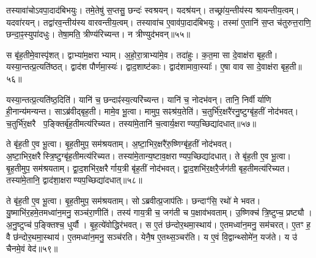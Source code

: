 तस्यावा॑चो\-ऽवपा॒दाद॑बिभयुः।
तमे॒तेषु॑ स॒प्तसु॒ छन्दः॑ स्वश्रयन्।
यदश्र॑यन्।
तच्छ्रा॑य॒न्तीय॑स्य श्रायन्तीय॒त्वम्।
यदवा॑रयन्।
तद्वा॑र\-व॒न्तीय॑स्य वारवन्तीय॒त्वम्।
तस्यावा॑च ए॒वाव॑पा॒दाद॑बिभयुः।
तस्मा॑ ए॒तानि॑ स॒प्त च॑तुरुत्त॒राणि॒ छन्दा॒ꣴ॒स्युपा॑दधुः।
तेषा॒मति॒ त्रीण्य॑रिच्यन्त।
न त्रीण्युद॑\-भवन्॥५५॥

स बृ॑ह॒तीमे॒वास्पृ॑शत्।
द्वाभ्या॑म॒क्षराभ्याम्।
अ॒हो॒रा॒त्राभ्या॑मे॒व।
तदा॑हुः।
क॒त॒मा सा दे॒वाक्ष॑रा बृह॒ती।
यस्या॒न्तत्प्र॒त्यति॑ष्ठत्।
द्वाद॑श पौर्णमा॒स्यः॑।
द्वाद॒शाष्ट॑काः।
द्वाद॑शामावा॒स्याः᳚।
ए॒षा वाव सा दे॒वाक्ष॑रा बृह॒ती॥५६॥

यस्या॒न्तत्प्र॒त्यति॑ष्ठ॒दिति॑।
यानि॑ च॒ छन्दाꣴ॑स्य॒त्यरि॑च्यन्त।
यानि॑ च॒ नोदभ॑वन्।
तानि॒ निर्वीर्याणि ही॒नान्य॑मन्यन्त।
साऽब्र॑वीद्बृह॒ती।
मामे॒व भू॒त्वा।
मामुप॒ सꣴश्र॑य॒तेति॑।
च॒तुर्भि॑र॒क्षरै॑रनु॒ष्टुग्बृ॑ह॒तीं नोद॑भवत्।
च॒तुर्भि॑र॒क्षरै प॒ङ्क्तिर्बृ॑ह॒ती\-मत्य॑रिच्यत।
तस्या॑मे॒तानि॑ च॒त्वार्य॒क्षराण्यप॒च्छिद्या॑\-दधात्॥५७॥

ते बृ॑ह॒ती ए॒व भू॒त्वा।
बृ॒ह॒तीमुप॒ सम॑श्रयताम्।
अ॒ष्टा॒भि\-र॒क्षरै॑रु॒ष्णिग्बृ॑ह॒तीं नोद॑भवत्।
अ॒ष्टा॒भि\-र॒क्षरैस्त्रि॒ष्टुग्बृ॑ह॒ती\-मत्य॑\-रिच्यत।
तस्या॑मे॒तान्य॒ष्टाव॒क्षराण्यप॒च्छिद्या॑\-दधात्।
ते बृ॑ह॒ती ए॒व भू॒त्वा।
बृ॒ह॒तीमुप॒ सम॑श्रयताम्।
द्वा॒द॒शभि॑र॒क्षरैर्गाय॒त्री बृ॑ह॒तीं नोद॑भवत्।
द्वा॒द॒शभि॑र॒क्षरै॒र्जग॑ती बृह॒तीमत्य॑रिच्यत।
तस्या॑मे॒तानि॒ द्वाद॑शा॒क्षराण्यप॒च्छिद्या॑\-दधात्॥५८॥

ते बृ॑ह॒ती ए॒व भू॒त्वा।
बृ॒ह॒तीमुप॒ सम॑श्रयताम्।
सोऽब्रवीत्प्र॒जाप॑तिः।
छन्दाꣳ॑सि॒ रथो॑ मे भवत।
यु॒ष्माभि॑र॒हमे॒तमध्वा॑न॒मनु॒ सञ्च॑रा॒णीति॑।
तस्य॑ गाय॒त्री च॒ जग॑ती च प॒क्षाव॑भवताम्।
उ॒ष्णिक्च॑ त्रि॒ष्टुप्च॒ प्रष्ट्यौ।
अ॒नु॒ष्टुप्च॑ प॒ङ्क्तिश्च॒ धुर्यौ।
बृ॒ह॒त्ये॑वोद्धिर॑भवत्।
स ए॒तं छ॑न्दोर॒थमा॒स्थाय॑।
ए॒तमध्वा॑न॒मनु॒ सम॑चरत्।
ए॒तꣳ ह॒ वै छ॑न्दोर॒थमा॒स्थाय॑।
ए॒तमध्वा॑न॒मनु॒ सञ्च॑रति।
येनै॒ष ए॒तथ्स॒ञ्चर॑ति।
य ए॒वं वि॒द्वान्थ्सोमे॑न॒ यज॑ते।
य उ॑ चैनमे॒वं वेद॑॥५९॥\anuvakamend[अ॒भ॒व॒न्वाव सा दे॒वाक्ष॑रा बृह॒त्य॑दधा॒द्द्वाद॑शा॒क्षराण्यप॒च्छिद्या॑दधादा॒स्थाय॒ षट्च॑]






\clearpage
{}
\setcounter{anuvakam}{0}

